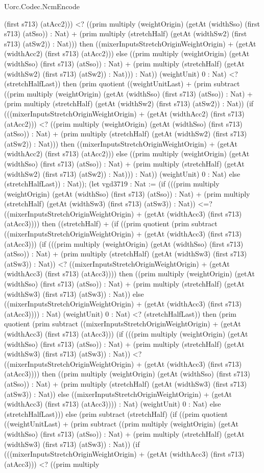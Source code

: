 \begin{lexlean}{Uorc.Codec.NcmEncode}
\begin{semanticmodule}
{(first s713) (atAcc2))) <? ((prim multiply (weightOrigin) (getAt (widthSso) (first s713) (atSso)) : Nat) + (prim multiply (stretchHalf) (getAt (widthSw2) (first s713) (atSw2)) : Nat))) then ((mixerInputsStretchOriginWeightOrigin) + (getAt (widthAcc2) (first s713) (atAcc2))) else ((prim multiply (weightOrigin) (getAt (widthSso) (first s713) (atSso)) : Nat) + (prim multiply (stretchHalf) (getAt (widthSw2) (first s713) (atSw2)) : Nat))) : Nat)) (weightUnit) 0 : Nat) <? (stretchHalfLast)) then (prim quotient ((weightUnitLast) + (prim subtract ((prim multiply (weightOrigin) (getAt (widthSso) (first s713) (atSso)) : Nat) + (prim multiply (stretchHalf) (getAt (widthSw2) (first s713) (atSw2)) : Nat)) (if (((mixerInputsStretchOriginWeightOrigin) + (getAt (widthAcc2) (first s713) (atAcc2))) <? ((prim multiply (weightOrigin) (getAt (widthSso) (first s713) (atSso)) : Nat) + (prim multiply (stretchHalf) (getAt (widthSw2) (first s713) (atSw2)) : Nat))) then ((mixerInputsStretchOriginWeightOrigin) + (getAt (widthAcc2) (first s713) (atAcc2))) else ((prim multiply (weightOrigin) (getAt (widthSso) (first s713) (atSso)) : Nat) + (prim multiply (stretchHalf) (getAt (widthSw2) (first s713) (atSw2)) : Nat))) : Nat)) (weightUnit) 0 : Nat) else (stretchHalfLast)) : Nat)); (let vgd3719 : Nat := (if (((prim multiply (weightOrigin) (getAt (widthSso) (first s713) (atSso)) : Nat) + (prim multiply (stretchHalf) (getAt (widthSw3) (first s713) (atSw3)) : Nat)) <=? ((mixerInputsStretchOriginWeightOrigin) + (getAt (widthAcc3) (first s713) (atAcc3)))) then ((stretchHalf) + (if ((prim quotient (prim subtract ((mixerInputsStretchOriginWeightOrigin) + (getAt (widthAcc3) (first s713) (atAcc3))) (if (((prim multiply (weightOrigin) (getAt (widthSso) (first s713) (atSso)) : Nat) + (prim multiply (stretchHalf) (getAt (widthSw3) (first s713) (atSw3)) : Nat)) <? ((mixerInputsStretchOriginWeightOrigin) + (getAt (widthAcc3) (first s713) (atAcc3)))) then ((prim multiply (weightOrigin) (getAt (widthSso) (first s713) (atSso)) : Nat) + (prim multiply (stretchHalf) (getAt (widthSw3) (first s713) (atSw3)) : Nat)) else ((mixerInputsStretchOriginWeightOrigin) + (getAt (widthAcc3) (first s713) (atAcc3)))) : Nat) (weightUnit) 0 : Nat) <? (stretchHalfLast)) then (prim quotient (prim subtract ((mixerInputsStretchOriginWeightOrigin) + (getAt (widthAcc3) (first s713) (atAcc3))) (if (((prim multiply (weightOrigin) (getAt (widthSso) (first s713) (atSso)) : Nat) + (prim multiply (stretchHalf) (getAt (widthSw3) (first s713) (atSw3)) : Nat)) <? ((mixerInputsStretchOriginWeightOrigin) + (getAt (widthAcc3) (first s713) (atAcc3)))) then ((prim multiply (weightOrigin) (getAt (widthSso) (first s713) (atSso)) : Nat) + (prim multiply (stretchHalf) (getAt (widthSw3) (first s713) (atSw3)) : Nat)) else ((mixerInputsStretchOriginWeightOrigin) + (getAt (widthAcc3) (first s713) (atAcc3)))) : Nat) (weightUnit) 0 : Nat) else (stretchHalfLast))) else (prim subtract (stretchHalf) (if ((prim quotient ((weightUnitLast) + (prim subtract ((prim multiply (weightOrigin) (getAt (widthSso) (first s713) (atSso)) : Nat) + (prim multiply (stretchHalf) (getAt (widthSw3) (first s713) (atSw3)) : Nat)) (if (((mixerInputsStretchOriginWeightOrigin) + (getAt (widthAcc3) (first s713) (atAcc3))) <? ((prim multiply }
\end{semanticmodule}
\end{lexlean}
